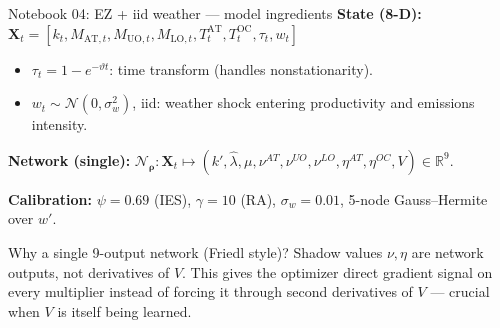 \documentclass[aspectratio=169,11pt]{beamer}
\newcommand{\emphc}[1]{\textcolor{harvardcrimson}{#1}}
\newcommand{\X}{\bm{X}}
\newcommand{\nn}{\mathcal{N}_{\bm{\rho}}}
\begin{document}
\begin{frame}{Notebook 04: EZ + iid weather --- model ingredients}
\small
\textbf{State (8-D):} $\X_t = [k_t, M_{\mathrm{AT},t}, M_{\mathrm{UO},t}, M_{\mathrm{LO},t}, T^{\mathrm{AT}}_t, T^{\mathrm{OC}}_t, \tau_t, w_t]$
\begin{itemize}\setlength\itemsep{0pt}
    \item $\tau_t = 1 - e^{-\vartheta t}$: time transform (handles nonstationarity).
    \item $w_t \sim \mathcal{N}(0,\sigma_w^2)$, iid: weather shock entering productivity and emissions intensity.
\end{itemize}

\textbf{Network (single):} $\nn : \X_t \mapsto (k', \hat\lambda, \mu, \nu^{\!AT}, \nu^{\!UO}, \nu^{\!LO}, \eta^{\!AT}, \eta^{\!OC}, V) \in \mathbb{R}^9$.

\textbf{Calibration:} $\psi = 0.69$ (IES), $\gamma = 10$ (RA), $\sigma_w = 0.01$, 5-node Gauss--Hermite over $w'$.

\vspace{0.15cm}
\begin{exampleblock}{Why a \emphc{single} 9-output network (Friedl style)?}
Shadow values $\nu, \eta$ are network outputs, not derivatives of $V$. This gives the optimizer direct gradient signal on every multiplier instead of forcing it through second derivatives of $V$ --- crucial when $V$ is itself being learned.
\end{exampleblock}
\end{frame}
\end{document}
